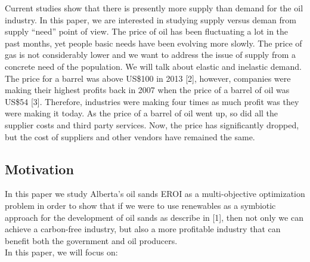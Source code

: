 \documentclass[12pt]{article}
\begin{document}
Current studies show that there is presently more supply than demand for the oil industry. In this paper, we are interested in studying supply versus deman from supply ``need'' point of view. The price of oil has been fluctuating a lot in the past months, yet people basic needs have been evolving more slowly. The price of gas is not considerably lower and we want to address the issue of  supply from a concrete need of the population. We will talk about elastic and inelastic demand. \\

The price for a barrel was above US\$100 in 2013 [2], however, companies were making their highest profits back in 2007 when the price of a barrel of oil was US\$54 [3]. Therefore, industries were making four times as much profit was they were making it today. As the price of a barrel of oil went up, so did all the supplier costs and third party services. Now, the price has significantly dropped, but the cost of suppliers and other vendors have remained the same. \\

\subsection{Motivation}
In this paper we study Alberta's oil sands EROI as a multi-objective optimization problem in order to show that if we were to use renewables as a symbiotic approach for the development of oil sands as describe in [1], then not only we can achieve a carbon-free industry, but also a more profitable industry that can benefit both the government and oil producers. \\

In this paper, we will focus on: 
\end{document}
